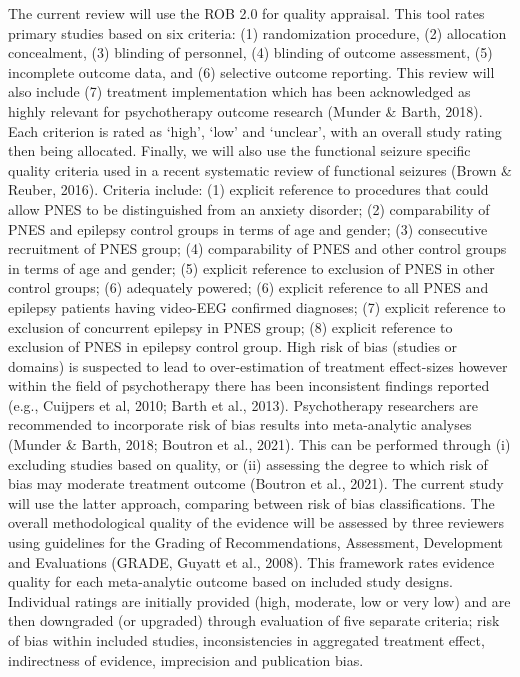 \documentclass[
  12pt,
  openany]{book}
\begin{document}
The current review will use the ROB 2.0 for quality appraisal. This tool rates primary studies based on six criteria: (1) randomization procedure, (2) allocation concealment, (3) blinding of personnel, (4) blinding of outcome assessment, (5) incomplete outcome data, and (6) selective outcome reporting. This review will also include (7) treatment implementation which has been acknowledged as highly relevant for psychotherapy outcome research (Munder \& Barth, 2018). Each criterion is rated as `high', `low' and `unclear', with an overall study rating then being allocated. Finally, we will also use the functional seizure specific quality criteria used in a recent systematic review of functional seizures (Brown \& Reuber, 2016). Criteria include: (1) explicit reference to procedures that could allow PNES to be distinguished from an anxiety disorder; (2) comparability of PNES and epilepsy control groups in terms of age and gender; (3) consecutive recruitment of PNES group; (4) comparability of PNES and other control groups in terms of age and gender; (5) explicit reference to exclusion of PNES in other control groups; (6) adequately powered; (6) explicit reference to all PNES and epilepsy patients having video-EEG confirmed diagnoses; (7) explicit reference to exclusion of concurrent epilepsy in PNES group; (8) explicit reference to exclusion of PNES in epilepsy control group.
High risk of bias (studies or domains) is suspected to lead to over-estimation of treatment effect-sizes however within the field of psychotherapy there has been inconsistent findings reported (e.g., Cuijpers et al, 2010; Barth et al., 2013). Psychotherapy researchers are recommended to incorporate risk of bias results into meta-analytic analyses (Munder \& Barth, 2018; Boutron et al., 2021). This can be performed through (i) excluding studies based on quality, or (ii) assessing the degree to which risk of bias may moderate treatment outcome (Boutron et al., 2021). The current study will use the latter approach, comparing between risk of bias classifications.
The overall methodological quality of the evidence will be assessed by three reviewers using guidelines for the Grading of Recommendations, Assessment, Development and Evaluations (GRADE, Guyatt et al., 2008). This framework rates evidence quality for each meta-analytic outcome based on included study designs. Individual ratings are initially provided (high, moderate, low or very low) and are then downgraded (or upgraded) through evaluation of five separate criteria; risk of bias within included studies, inconsistencies in aggregated treatment effect, indirectness of evidence, imprecision and publication bias.
\end{document}
